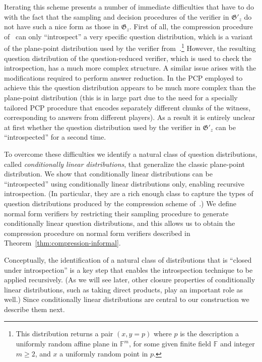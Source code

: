 \documentclass[11pt]{article}
\theoremstyle{definition}
\newcommand{\F}{\ensuremath{\mathbb{F}}}
\newcommand{\game}{\mathfrak{G}}
\begin{document}
	Iterating this scheme presents a number of immediate difficulties that have to do with the fact that the sampling and decision procedures of the verifier in $\game'_z$ do not have such a nice form as those in $\game_z$. First of all,  the compression procedure of~\cite{NW19} can only ``introspect'' a very specific question distribution, which is a variant of the plane-point distribution used by the verifier from~\cite{natarajan2018two}.\footnote{This distribution returns a pair $(x,y=p)$ where $p$ is the description a uniformly random affine plane in $\F^m$, for some given finite field $\F$ and integer $m\geq 2$, and $x$ a uniformly random point in $p$.} However, the resulting question distribution of the question-reduced verifier, which is used to check the introspection, has a much more complex structure. A similar issue arises with the modifications required to perform answer reduction. In the PCP employed to achieve this the question distribution appears to be much more complex than the  plane-point distribution (this is in large part due to the need for a specially tailored PCP procedure that encodes separately different chunks of the witness, corresponding to answers from different players). As a result it is entirely unclear at first whether the question distribution used by the verifier in $\game'_z$ can be ``introspected'' for a second time. 
	
	To overcome these difficulties we identify a natural class of question distributions, called \emph{conditionally linear distributions}, that generalize the classic plane-point distribution. We show that conditionally linear distributions can be ``introspected'' using conditionally linear distributions only, enabling recursive introspection. (In particular, they are a rich enough class to capture the types of question distributions produced by the compression scheme of~\cite{NW19}.) We define normal form verifiers by restricting their sampling procedure to generate conditionally linear question distributions, and this allows us to obtain the compression procedure on normal form verifiers described in Theorem~\ref{thm:compression-informal}. 
	
	Conceptually,  the identification of a natural class of distributions that is ``closed under introspection'' is a key step that enables the introspection technique to be applied recursively. (As we will see later, other closure properties of conditionally linear distributions, such as taking direct products, play an important role as well.) Since conditionally linear distributions are central to our construction we describe them next. 
	
\end{document}
